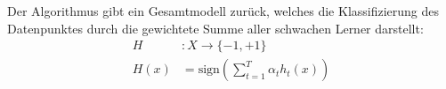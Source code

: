 Der Algorithmus gibt ein Gesamtmodell zurück, welches die Klassifizierung des Datenpunktes durch die gewichtete
Summe aller schwachen Lerner darstellt:
\begin{align*}
    H    & :      X \rightarrow \{-1, +1\}                       \\
    H(x) & =  \text{sign}\left(\sum_{t=1}^T\alpha_th_t(x)\right)
\end{align*}